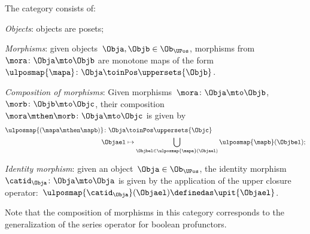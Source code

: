 \begin{definition}
\label{def:upos_cat}
The category \UPos consists of:
\begin{compactenum}
    \item \emph{Objects}: objects are posets;
    \item \emph{Morphisms}: given objects~$\Obja,\Objb\in \Ob_{\UPos}$, morphisms from~$\mora\colon \Obja \mto \Objb$ are monotone maps of the form~$\ulposmap{\mapa} \colon \Obja \toinPos \uppersets{\Objb}$.
    \item \emph{Composition of morphisms}: Given morphisms~$\mora\colon \Obja \mto \Objb$,~$\morb\colon \Objb\mto \Objc$, their composition~$\mora\mthen \morb\colon \Obja\mto \Objc$ is given by
    \begin{equation}
    \begin{aligned}
        \ulposmap{(\mapa \mthen \mapb)} \colon \Obja&\toinPos \uppersets{\Objc}\\
        \Objael&\mapsto \bigcup_{\Objbel\in \ulposmap{\mapa}(\Objael)}\ulposmap{\mapb}(\Objbel);
    \end{aligned}
    \end{equation}
    \item \emph{Identity morphism}: given an object~$\Obja\in \Ob_{\UPos}$, the identity morphism~$\catid_\Obja \colon \Obja \mto \Obja$ is given by the application of the upper closure operator:~$\ulposmap{\catid_\Obja}(\Objael)\definedas \upit\{\Objael\}$.
\end{compactenum}
\end{definition}

\begin{remark}
Note that the composition of morphisms in this category corresponds to the generalization of the series operator for boolean profunctors.
\end{remark}

